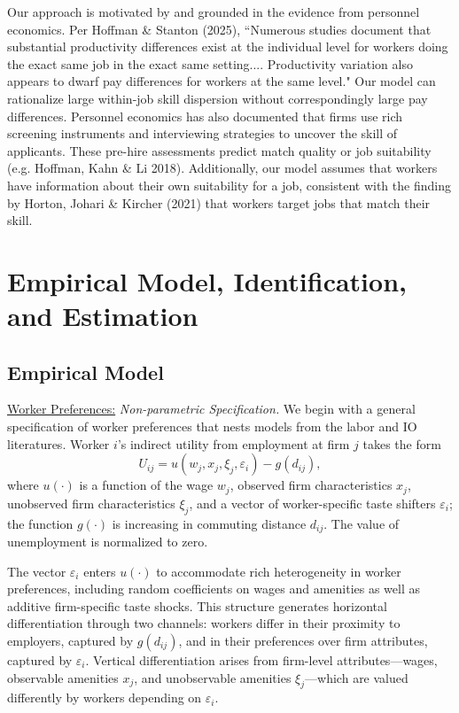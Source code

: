 \documentclass[11pt]{article}
\begin{document}
Our approach is motivated by and grounded in the evidence from personnel economics. Per Hoffman \& Stanton (2025), ``Numerous studies document that substantial productivity differences exist at the individual level for workers doing the exact same job in the exact same
setting.... Productivity variation also appears to dwarf pay differences for workers at the same level." Our model can rationalize large within-job skill dispersion without correspondingly large pay differences. Personnel economics has also documented that firms use rich screening instruments and interviewing strategies to uncover the skill of applicants. These pre-hire assessments predict match quality or job suitability (e.g. Hoffman, Kahn \& Li 2018). Additionally, our model assumes that workers have information about their own suitability for a job, consistent with the finding by Horton, Johari \& Kircher (2021) that workers target jobs that match their skill. %







\section{Empirical Model, Identification, and Estimation}\label{sec:model}

\subsection{Empirical Model}

\underline{Worker Preferences:} \textit{Non-parametric Specification.} We begin with a general specification of worker preferences that nests models from the labor and IO literatures. Worker $i$'s indirect utility from employment at firm $j$ takes the form
$$U_{ij} = u(w_j, x_j, \xi_j, \varepsilon_i) - g(d_{ij}),$$
where $u(\cdot)$ is a function of the wage $w_j$, observed firm characteristics $x_j$, unobserved firm characteristics $\xi_j$, and a vector of worker-specific taste shifters $\varepsilon_i$; the function $g(\cdot)$ is increasing in commuting distance $d_{ij}$. The value of unemployment is normalized to zero. 

The vector $\varepsilon_i$ enters $u(\cdot)$ to accommodate rich heterogeneity in worker preferences, including random coefficients on wages and amenities as well as additive firm-specific taste shocks. This structure generates horizontal differentiation through two channels: workers differ in their proximity to employers, captured by $g(d_{ij})$, and in their preferences over firm attributes, captured by $\varepsilon_i$. Vertical differentiation arises from firm-level attributes---wages, observable amenities $x_j$, and unobservable amenities $\xi_j$---which are valued differently by workers depending on $\varepsilon_i$.
 
\end{document}
